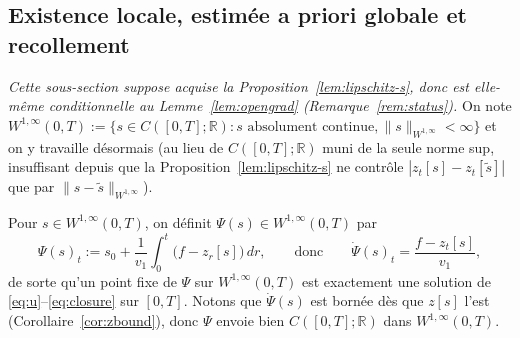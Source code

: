 \documentclass[11pt,a4paper]{article}
\newcommand{\R}{\mathbb{R}}
\theoremstyle{plain}
\theoremstyle{definition}
\begin{document}
\subsection{Existence locale, estim\'ee a priori globale et recollement}
\label{sec:fixedpoint}

\emph{Cette sous-section suppose acquise la Proposition~\ref{lem:lipschitz-s}, donc est elle-m\^eme conditionnelle au Lemme~\ref{lem:opengrad} (Remarque~\ref{rem:status}).} On note $W^{1,\infty}(0,T):=\{s\in C([0,T];\R): s \text{ absolument continue}, \|s\|_{W^{1,\infty}}<\infty\}$ et on y travaille d\'esormais (au lieu de $C([0,T];\R)$ muni de la seule norme sup, insuffisant depuis que la Proposition~\ref{lem:lipschitz-s} ne contr\^ole $|z_t[s]-z_t[\tilde s]|$ que par $\|s-\tilde s\|_{W^{1,\infty}}$).

Pour $s\in W^{1,\infty}(0,T)$, on d\'efinit $\Psi(s)\in W^{1,\infty}(0,T)$ par
\[
\Psi(s)_t := s_0 + \frac1{v_1}\int_0^t\big(f-z_r[s]\big)\,dr, \qquad\text{donc}\qquad \dot\Psi(s)_t = \frac{f-z_t[s]}{v_1},
\]
de sorte qu'un point fixe de $\Psi$ sur $W^{1,\infty}(0,T)$ est exactement une solution de \eqref{eq:u}--\eqref{eq:closure} sur $[0,T]$. Notons que $\dot\Psi(s)$ est born\'ee d\`es que $z[s]$ l'est (Corollaire~\ref{cor:zbound}), donc $\Psi$ envoie bien $C([0,T];\R)$ dans $W^{1,\infty}(0,T)$.
\end{document}
